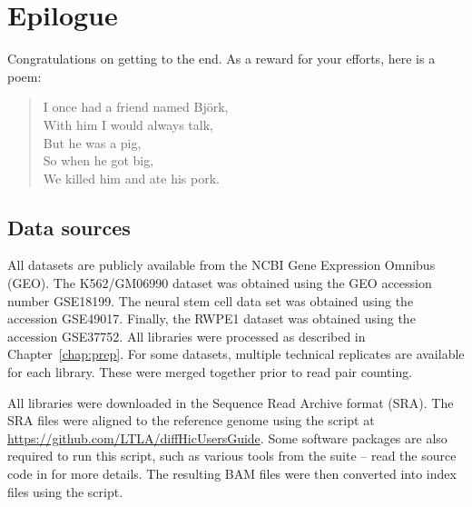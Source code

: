 \documentclass{report}\usepackage[]{graphicx}\usepackage[usenames,dvipsnames]{color}
\newenvironment{combox}
{ \definecolor{shadecolor}{RGB}{255, 240, 240} \begin{shaded}\begin{center}\begin{minipage}[t]{0.95\textwidth} }
{ \end{minipage}\end{center}\end{shaded} \definecolor{shadecolor}{RGB}{240,240,240} }
\begin{document}

\chapter{Epilogue}

\begin{combox}
Congratulations on getting to the end.
As a reward for your efforts, here is a poem:
\begin{quote}
I once had a friend named Bj\"ork, \\
With him I would always talk, \\
But he was a pig, \\
So when he got big, \\
We killed him and ate his pork.
\end{quote}
\end{combox}

\section{Data sources}
All datasets are publicly available from the NCBI Gene Expression Omnibus (GEO).
The K562/GM06990 dataset \cite{lieberman2009comprehensive} was obtained using the GEO accession number GSE18199.
The neural stem cell data set \cite{sofueva2013cohesin} was obtained using the accession GSE49017.
Finally, the RWPE1 dataset  \cite{rickman2012oncogene} was obtained using the accession GSE37752.
All libraries were processed as described in Chapter~\ref{chap:prep}.
For some datasets, multiple technical replicates are available for each library.
These were merged together prior to read pair counting.

All libraries were downloaded in the Sequence Read Archive format (SRA).
The SRA files were aligned to the reference genome using the  script at \url{https://github.com/LTLA/diffHicUsersGuide}.
Some software packages are also required to run this script, such as various tools from the  suite -- read the source code in  for more details.
The resulting BAM files were then converted into index files using the  script.
\end{document}
